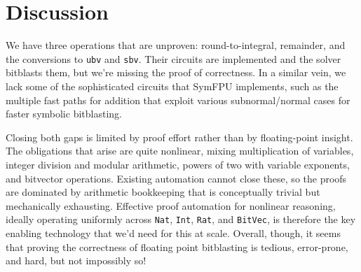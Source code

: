 \section{Discussion}
\label{sec:fp:limitations}

We have three operations that are unproven:
round-to-integral, remainder, and the conversions to \texttt{ubv} and \texttt{sbv}.
Their circuits are implemented and the solver bitblasts them, but we're missing the proof of correctness.
In a similar vein, we lack some of the sophisticated circuits that SymFPU implements,
such as the multiple fast paths for addition that exploit various subnormal/normal cases for faster symbolic bitblasting.

Closing both gaps is limited by proof effort rather than by floating-point insight.
The obligations that arise are quite nonlinear, mixing multiplication of variables, integer division and modular arithmetic, powers of two with variable exponents, and bitvector operations.
Existing automation cannot close these, so the proofs are dominated by arithmetic bookkeeping that is conceptually trivial but mechanically exhausting.
Effective proof automation for nonlinear reasoning, ideally operating uniformly across \texttt{Nat}, \texttt{Int}, \texttt{Rat}, and \texttt{BitVec},
is therefore the key enabling technology that we'd need for this at scale.
Overall, though, it seems that proving the correctness of floating point bitblasting is tedious, error-prone, and hard, but not impossibly so!
